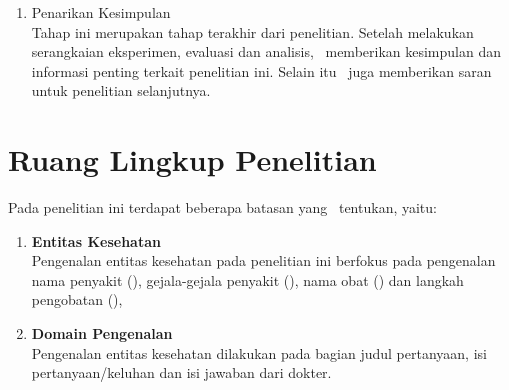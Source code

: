 \begin{enumerate}
	\item Penarikan Kesimpulan \\
	Tahap ini merupakan tahap terakhir dari penelitian. Setelah melakukan serangkaian eksperimen, evaluasi dan analisis, \saya~memberikan kesimpulan dan informasi penting terkait penelitian ini. Selain itu \saya~juga memberikan saran untuk penelitian selanjutnya.
\end{enumerate}

\section{Ruang Lingkup Penelitian}
Pada penelitian ini terdapat beberapa batasan yang \saya~tentukan, yaitu:
\begin{enumerate}
\item{\bf Entitas Kesehatan}\\
Pengenalan entitas kesehatan pada penelitian ini berfokus pada pengenalan nama penyakit (\disease), gejala-gejala penyakit (\symptom), nama obat (\drug) dan langkah pengobatan (\treatment),

\item{\bf Domain Pengenalan}\\
Pengenalan entitas kesehatan dilakukan pada bagian judul pertanyaan, isi pertanyaan/keluhan dan isi jawaban dari dokter.
\end{enumerate}


